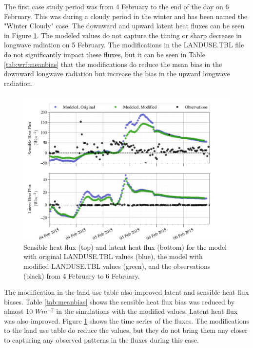 The first case study period was from 4 February to the end of the day on 6 February. This was during a cloudy period in the winter and has been named the "Winter Cloudy" case. The downward and upward latent heat fluxes can be seen in Figure \ref{fig:c1:heat}. The modeled values do not capture the timing or sharp decrease in longwave radiation on 5 February. The modifications in the LANDUSE.TBL file do not significantly impact these fluxes, but it can be seen in Table \ref{tab:wrf:meanbias} that the modifications do reduce the mean bias in the downward longwave radiation but increase the bias in the upward longwave radiation. 

\begin{figure}[H]
    \centering
    \includegraphics[width=1\linewidth]{figures/chapter6/case1_sensible_latent.png}
    \caption[Idealized Case 1 - Latent and sensible heat fluxes]{Sensible heat flux (top) and latent heat flux (bottom) for the model with original LANDUSE.TBL values (blue), the model with modified LANDUSE.TBL values (green), and the observations (black) from 4 February to 6 February.}
    \label{fig:c1:heat}
\end{figure}

The modification in the land use table also improved latent and sensible heat flux biases. Table \ref{tab:meanbias} shows the sensible heat flux bias was reduced by almost 10 $Wm^{-2}$ in the simulations with the modified values. Latent heat flux was also improved. Figure \ref{fig:c1:heat} shows the time series of the fluxes. The modifications to the land use table do reduce the values, but they do not bring them any closer to capturing any observed patterns in the fluxes during this case.

